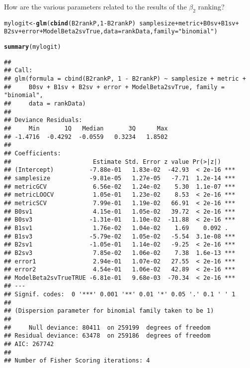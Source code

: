 \documentclass{article}\usepackage[]{graphicx}\usepackage[]{color}
\makeatletter
\newcommand{\hlnum}[1]{\textcolor[rgb]{0.686,0.059,0.569}{#1}}%
\newcommand{\hlstr}[1]{\textcolor[rgb]{0.192,0.494,0.8}{#1}}%
\newcommand{\hlopt}[1]{\textcolor[rgb]{0,0,0}{#1}}%
\newcommand{\hlstd}[1]{\textcolor[rgb]{0.345,0.345,0.345}{#1}}%
\newcommand{\hlkwb}[1]{\textcolor[rgb]{0.69,0.353,0.396}{#1}}%
\newcommand{\hlkwc}[1]{\textcolor[rgb]{0.333,0.667,0.333}{#1}}%
\newcommand{\hlkwd}[1]{\textcolor[rgb]{0.737,0.353,0.396}{\textbf{#1}}}%
\newenvironment{kframe}{%
 \def\at@end@of@kframe{}%
 \ifinner\ifhmode%
  \def\at@end@of@kframe{\end{minipage}}%
  \begin{minipage}{\columnwidth}%
 \fi\fi%
 \def\FrameCommand##1{\hskip\@totalleftmargin \hskip-\fboxsep
 \colorbox{shadecolor}{##1}\hskip-\fboxsep
     \hskip-\linewidth \hskip-\@totalleftmargin \hskip\columnwidth}%
 \MakeFramed {\advance\hsize-\width
   \@totalleftmargin\z@ \linewidth\hsize
   \@setminipage}}%
 {\par\unskip\endMakeFramed%
 \at@end@of@kframe}
\newenvironment{knitrout}{}{} %
\makeatother
\begin{document}
How are the various parameters related to the results of the $\beta _2$ ranking?
\begin{knitrout}
\color{fgcolor}\begin{kframe}
\begin{alltt}
\hlstd{mylogit} \hlkwb{<-} \hlkwd{glm}\hlstd{(}\hlkwd{cbind}\hlstd{(B2rankP,} \hlnum{1} \hlopt{-} \hlstd{B2rankP)} \hlopt{~} \hlstd{samplesize} \hlopt{+} \hlstd{metric} \hlopt{+} \hlstd{B0sv} \hlopt{+} \hlstd{B1sv} \hlopt{+}
    \hlstd{B2sv} \hlopt{+} \hlstd{error} \hlopt{+} \hlstd{ModelBeta2svTrue,} \hlkwc{data} \hlstd{= rankData,} \hlkwc{family} \hlstd{=} \hlstr{"binomial"}\hlstd{)}
\end{alltt}


{\ttfamily\noindent\color{warningcolor}{\#\# Warning: non-integer counts in a binomial glm!}}\begin{alltt}
\hlkwd{summary}\hlstd{(mylogit)}
\end{alltt}
\begin{verbatim}
## 
## Call:
## glm(formula = cbind(B2rankP, 1 - B2rankP) ~ samplesize + metric + 
##     B0sv + B1sv + B2sv + error + ModelBeta2svTrue, family = "binomial", 
##     data = rankData)
## 
## Deviance Residuals: 
##     Min       1Q   Median       3Q      Max  
## -1.4716  -0.4292  -0.0559   0.3234   1.8502  
## 
## Coefficients:
##                       Estimate Std. Error z value Pr(>|z|)    
## (Intercept)          -7.88e-01   1.83e-02  -42.93  < 2e-16 ***
## samplesize           -9.81e-05   1.27e-05   -7.71  1.2e-14 ***
## metricGCV             6.56e-02   1.24e-02    5.30  1.1e-07 ***
## metricLOOCV           1.05e-01   1.23e-02    8.53  < 2e-16 ***
## metricSCV             7.99e-01   1.19e-02   66.91  < 2e-16 ***
## B0sv1                 4.15e-01   1.05e-02   39.72  < 2e-16 ***
## B0sv3                -1.31e-01   1.10e-02  -11.88  < 2e-16 ***
## B1sv1                 1.76e-02   1.04e-02    1.69    0.092 .  
## B1sv3                -5.79e-02   1.05e-02   -5.54  3.1e-08 ***
## B2sv1                -1.05e-01   1.14e-02   -9.25  < 2e-16 ***
## B2sv3                 7.85e-02   1.06e-02    7.38  1.6e-13 ***
## error1                2.94e-01   1.07e-02   27.55  < 2e-16 ***
## error2                4.54e-01   1.06e-02   42.89  < 2e-16 ***
## ModelBeta2svTrueTRUE -6.81e-01   9.68e-03  -70.34  < 2e-16 ***
## ---
## Signif. codes:  0 '***' 0.001 '**' 0.01 '*' 0.05 '.' 0.1 ' ' 1
## 
## (Dispersion parameter for binomial family taken to be 1)
## 
##     Null deviance: 80411  on 259199  degrees of freedom
## Residual deviance: 63478  on 259186  degrees of freedom
## AIC: 267742
## 
## Number of Fisher Scoring iterations: 4
\end{verbatim}
\end{kframe}
\end{knitrout}
\end{document}
